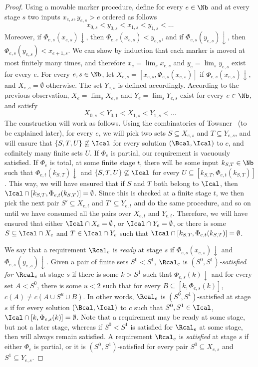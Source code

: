 \begin{proof}
Using a movable marker procedure, define for every $e \in \Nb$ and at every stage $s$ two inputs $x_{e,s}, y_{e,s} > e$ ordered as follows
$$
x_{0,s} < y_{0,s} < x_{1,s} < y_{1,s} < \dots 
$$
Moreover, if $\Phi_{e,s}(x_{e,s})\downarrow$, then $\Phi_{e,s}(x_{e,s}) < y_{e,s}$, and if $\Phi_{e,s}(y_{e,s})\downarrow$, then $\Phi_{e,s}(y_{e,s}) < x_{e+1,s}$. We can show by induction that each marker is moved at most finitely many times, and therefore $x_e = \lim_s x_{e,s}$ and $y_e = \lim_s y_{e,s}$ exist for every $e$. For every $e, s \in \Nb$, let $X_{e,s} = [x_{e,s}, \Phi_{e,s}(x_{e,s})]$ if $\Phi_{e,s}(x_{e,s})\downarrow$, and $X_{e,s} = \emptyset$ otherwise. The set $Y_{e,s}$ is defined accordingly.
	According to the previous observation, $X_e = \lim_s X_{e,s}$ and $Y_e = \lim_s Y_{e,s}$ exist for every $e \in \Nb$, and satisfy
$$
X_{0,s} < Y_{0,1} < X_{1,s} < Y_{1,s} < \dots
$$
The construction will work as follows. Using the combinatorics of Towsner~\cite[Theorem 3.8]{Towsner2012simple} (to be explained later), for every $e$, we will pick two sets $S \subseteq X_{e,s}$ and $T \subseteq Y_{e,s}$, and will ensure that $\{S, T, U\} \not \subseteq \Ical$ for every solution $(\Bcal, \Ical)$ to $c$, and cofinitely many finite sets $U$. If $\Phi_e$ is partial, our requirement is vacuously satisfied. If $\Phi_e$ is total, at some finite stage $t$, there will be some input $k_{S,T} \in \Nb$ such that $\Phi_{e,t}(k_{S,T})\downarrow$ and $\{S, T, U\} \not \subseteq \Ical$ for every $U \subseteq [k_{S,T}, \Phi_{e,t}(k_{S,T})]$. This way, we will have ensured that if $S$ and $T$ both belong to $\Ical$, then $\Ical \cap [k_{S,T}, \Phi_{e,t}(k_{S,T})] = \emptyset$. Since this is checked at a finite stage $t$, we then pick the next pair $S' \subseteq X_{e,t}$ and $T' \subseteq Y_{e,t}$ and do the same procedure, and so on until we have consumed all the pairs over $X_{e,t}$ and $Y_{e,t}$.
Therefore, we will have ensured that either $\Ical \cap X_e = \emptyset$, or $\Ical \cap Y_e = \emptyset$, or there is some $S \subseteq \Ical \cap X_e$ and $T \in \Ical \cap Y_e$
such that $\Ical \cap [k_{S,T}, \Phi_{e,t}(k_{S,T})] = \emptyset$. 

We say that a requirement $\Rcal_e$ is \emph{ready} at stage $s$ if 
$\Phi_{e,s}(x_{e,s})\downarrow$ and $\Phi_{e,s}(y_{e,s})\downarrow$.
Given a pair of finite sets $S^0 < S^1$, $\Rcal_e$ is \emph{$(S^0, S^1)$-satisfied for $\Rcal_e$} at stage $s$
if there is some $k > S^1$ such that $\Phi_{e,s}(k)\downarrow$
and for every set $A < S^0$, there is some $u < 2$ such that
for every $B \subseteq [k, \Phi_{e,s}(k)]$, $c(A) \neq c(A \cup S^u \cup B)$. In other words, $\Rcal_e$ is $(S^0,S^1)$-satisfied at stage $s$ if for every solution $(\Bcal, \Ical)$ to $c$ such that $S^0, S^1 \in \Ical$, $\Ical \cap [k, \Phi_{e,s}(k)] = \emptyset$. Note that a requirement may be ready at some stage, but not a later stage, whereas if $S^0 < S^1$ is satisfied for $\Rcal_e$ at some stage, then will always remain satisfied.
A requirement $\Rcal_e$ is \emph{satisfied} at stage $s$ if either $\Phi_e$ is partial, or it is $(S^0, S^1)$-satisfied for every pair $S^0 \subseteq X_{e,s}$ and $S^1 \subseteq Y_{e,s}$.


\end{proof}
